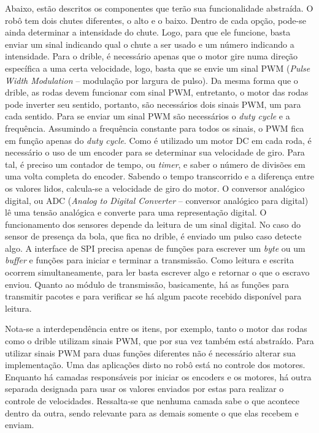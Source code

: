 Abaixo, estão descritos os componentes que terão sua funcionalidade abstraída.
O robô tem dois chutes diferentes, o alto e o baixo. Dentro de cada opção, pode-se ainda determinar a intensidade do chute. Logo, para que ele funcione, basta enviar um sinal indicando qual o chute a ser usado e um número indicando a intensidade.
Para o drible, é necessário apenas que o motor gire numa direção específica a uma certa velocidade, logo, basta que se envie um sinal PWM (\textit{Pulse Width Modulation} – modulação por largura de pulso). Da mesma forma que o drible, as rodas devem funcionar com sinal PWM, entretanto, o motor das rodas pode inverter seu sentido, portanto, são necessários dois sinais PWM, um para cada sentido. Para se enviar um sinal PWM são necessários o \textit{duty cycle} e a frequência. Assumindo a frequência constante para todos os sinais, o PWM fica em função apenas do \textit{duty cycle}. Como é utilizado um motor DC em cada roda, é necessário o uso de um encoder para se determinar sua velocidade de giro. Para tal, é preciso um contador de tempo, ou \textit{timer}, e saber o número de divisões em uma volta completa do encoder. Sabendo o tempo transcorrido e a diferença entre os valores lidos, calcula-se a velocidade de giro do motor.
O conversor analógico digital, ou ADC (\textit{Analog to Digital Converter} – conversor analógico para digital) lê uma tensão analógica e converte para uma representação digital. O funcionamento dos sensores depende da leitura de um sinal digital. No caso do sensor de presença da bola, que fica no drible, é enviado um pulso caso detecte algo.
A interface de SPI precisa apenas de funções para escrever um \textit{byte} ou um \textit{buffer} e funções para iniciar e terminar a transmissão. Como leitura e escrita ocorrem simultaneamente, para ler basta escrever algo e retornar o que o escravo enviou.
Quanto ao módulo de transmissão, basicamente, há as funções para transmitir pacotes e para verificar se há algum pacote recebido disponível para leitura.

Nota-se a interdependência entre os itens, por exemplo, tanto o motor das rodas como o drible utilizam sinais PWM, que por sua vez também está abstraído. Para utilizar sinais PWM para duas funções diferentes não é necessário alterar sua implementação.
Uma das aplicações disto no robô está no controle dos motores. Enquanto há camadas responsáveis por iniciar os encoders e os motores, há outra separada designada para usar os valores enviados por estas para realizar o controle de velocidades. Ressalta-se que nenhuma camada sabe o que acontece dentro da outra, sendo relevante para as demais somente o que elas recebem e enviam.


